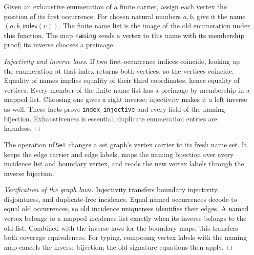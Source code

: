 
\begin{definition}
Given an exhaustive enumeration of a finite carrier, assign each vertex the
position of its first occurrence. For chosen natural numbers $a,b$, give it the
name $(a,b,\mathsf{index}(v))$. The finite name list is the image of the old
enumeration under this function. The map \texttt{naming} sends a vertex to this
name with its membership proof; its inverse chooses a preimage.
\end{definition}
\begin{proof}[Injectivity and inverse laws]
If two first-occurrence indices coincide, looking up the enumeration at that
index returns both vertices, so the vertices coincide. Equality of names implies
equality of their third coordinates, hence equality of vertices. Every member
of the finite name list has a preimage by membership in a mapped list. Choosing
one gives a right inverse; injectivity makes it a left inverse as well.
These facts prove \texttt{index\_injective} and every field of the naming
bijection. Exhaustiveness is essential; duplicate enumeration entries are harmless.
\end{proof}





\begin{definition}
The operation \texttt{ofSet} changes a set graph's vertex carrier to its fresh
name set. It keeps the edge carrier and edge labels, maps the naming bijection
over every incidence list and boundary vertex, and reads the new vertex labels
through the inverse bijection.
\end{definition}
\begin{proof}[Verification of the graph laws]
Injectivity transfers boundary injectivity, disjointness, and duplicate-free
incidence. Equal named occurrences decode to equal old occurrences, so old
incidence uniqueness identifies their edges. A named vertex belongs to a mapped
incidence list exactly when its inverse belongs to the old list. Combined with
the inverse laws for the boundary maps, this transfers both coverage equivalences.
For typing, composing vertex labels with the naming map cancels the inverse
bijection; the old signature equations then apply.
\end{proof}

